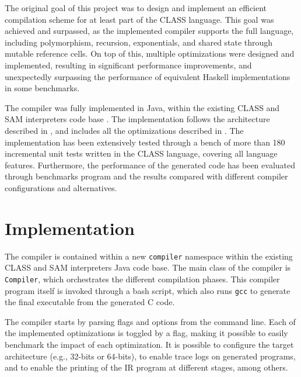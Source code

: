 \label{chap:evaluation}

The original goal of this project was to design and implement an efficient compilation scheme for at least part of the \ac{CLASS} language. This goal was achieved and surpassed, as the implemented compiler supports the full language, including polymorphism, recursion, exponentials, and shared state through mutable reference cells. On top of this, multiple optimizations were designed and implemented, resulting in significant performance improvements, and unexpectedly surpassing the performance of equivalent Haskell implementations in some benchmarks.


The compiler was fully implemented in Java, within the existing \ac{CLASS} and \ac{SAM} interpreters code base \cite{Caires:2024:artifact}. The implementation follows the architecture described in , and includes all the optimizations described in . The implementation has been extensively tested through a bench of more than 180 incremental unit tests written in the \ac{CLASS} language, covering all language features. Furthermore, the performance of the generated code has been evaluated through benchmarks program and the results compared with different compiler configurations and alternatives.

\section{Implementation}

The compiler is contained within a new \texttt{compiler} namespace within the existing \ac{CLASS} and \ac{SAM} interpreters Java code base. The main class of the compiler is \texttt{Compiler}, which orchestrates the different compilation phases. This compiler program itself is invoked through a bash script, which also runs \texttt{gcc} to generate the final executable from the generated C code.

The compiler starts by parsing flags and options from the command line. Each of the implemented optimizations is toggled by a flag, making it possible to easily benchmark the impact of each optimization. It is possible to configure the target architecture (e.g., 32-bits or 64-bits), to enable trace logs on generated programs, and to enable the printing of the \ac{IR} program at different stages, among others.

